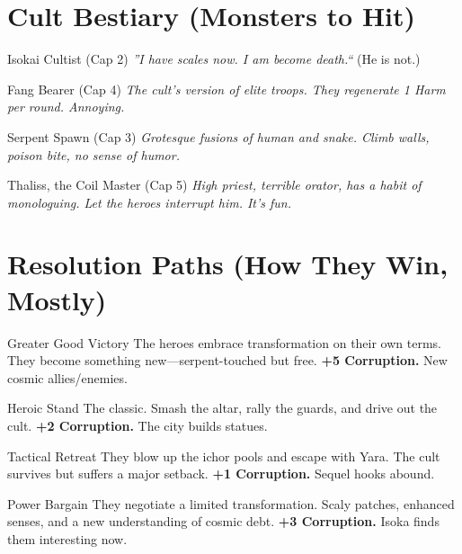 \documentclass[11pt]{article}
\begin{document}
\section*{Cult Bestiary (Monsters to Hit)}

\begin{mechanicsbox}{Isokai Cultist (Cap 2)}
\textit{''I have scales now. I am become death.``} (He is not.)
\end{mechanicsbox}

\begin{mechanicsbox}{Fang Bearer (Cap 4)}
\textit{The cult's version of elite troops. They regenerate 1 Harm per round. Annoying.}
\end{mechanicsbox}

\begin{mechanicsbox}{Serpent Spawn (Cap 3)}
\textit{Grotesque fusions of human and snake. Climb walls, poison bite, no sense of humor.}
\end{mechanicsbox}

\begin{mechanicsbox}{Thaliss, the Coil Master (Cap 5)}
\textit{High priest, terrible orator, has a habit of monologuing. Let the heroes interrupt him. It's fun.}
\end{mechanicsbox}

\section*{Resolution Paths (How They Win, Mostly)}

\begin{mechanicsbox}{Greater Good Victory}
The heroes embrace transformation on their own terms. They become something new---serpent-touched but free. \textbf{+5 Corruption.} New cosmic allies/enemies.
\end{mechanicsbox}

\begin{mechanicsbox}{Heroic Stand}
The classic. Smash the altar, rally the guards, and drive out the cult. \textbf{+2 Corruption.} The city builds statues.
\end{mechanicsbox}

\begin{mechanicsbox}{Tactical Retreat}
They blow up the ichor pools and escape with Yara. The cult survives but suffers a major setback. \textbf{+1 Corruption.} Sequel hooks abound.
\end{mechanicsbox}

\begin{mechanicsbox}{Power Bargain}
They negotiate a limited transformation. Scaly patches, enhanced senses, and a new understanding of cosmic debt. \textbf{+3 Corruption.} Isoka finds them interesting now.
\end{mechanicsbox}
\end{document}
